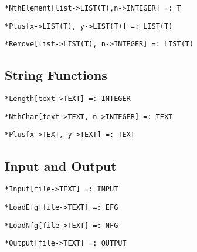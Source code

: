 \protect \large \begin{verbatim}
*NthElement[list->LIST(T),n->INTEGER] =: T 
\end{verbatim}\normalsize

\protect \large \begin{verbatim}
*Plus[x->LIST(T), y->LIST(T)] =: LIST(T)
\end{verbatim}\normalsize

\protect \large \begin{verbatim}
*Remove[list->LIST(T), n->INTEGER] =: LIST(T)
\end{verbatim}\normalsize


\medskip
\subsection{String Functions}

\protect \large \begin{verbatim}
*Length[text->TEXT] =: INTEGER
\end{verbatim}\normalsize

\protect \large \begin{verbatim}
*NthChar[text->TEXT, n->INTEGER] =: TEXT
\end{verbatim}\normalsize

\protect \large \begin{verbatim}
*Plus[x->TEXT, y->TEXT] =: TEXT
\end{verbatim} \normalsize



\medskip
\subsection{Input and Output}


\protect \large \begin{verbatim}
*Input[file->TEXT] =: INPUT
\end{verbatim}\normalsize

\protect \large \begin{verbatim}
*LoadEfg[file->TEXT] =: EFG
\end{verbatim}\normalsize

\protect \large \begin{verbatim}
*LoadNfg[file->TEXT] =: NFG
\end{verbatim}\normalsize

\protect \large \begin{verbatim}
*Output[file->TEXT] =: OUTPUT
\end{verbatim}\normalsize

